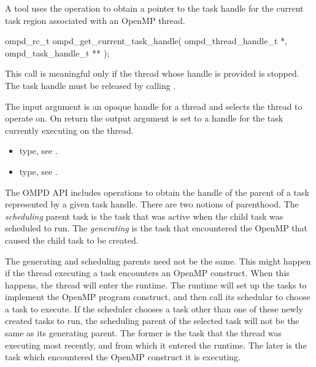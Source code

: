 
\label{ompd:ompd_get_current_task_handle}
\summary
A tool uses the  operation to obtain a pointer to the 
task handle for the current task region associated with an OpenMP thread.

\format

\cspecificstart
\begin{ompSyntax}
ompd_rc_t ompd_get_current_task_handle(
  ompd_thread_handle_t *,
  ompd_task_handle_t **
);
\end{ompSyntax}
\cspecificend


\descr
This call is meaningful only if the thread whose handle is provided is stopped.
The task handle must be released by calling .

\argdesc
The input argument  is an opaque handle for a thread and selects the thread to operate on.
On return the output argument  is set to a handle for the task
currently executing on the thread.

\crossreferences
\begin{itemize}
	\item {} type, see .
	\item {} type, see .
\end{itemize}

The OMPD API includes operations to obtain the handle of the parent of a task represented by a 
given task handle. There are two notions of parenthood. The \emph{scheduling} parent task is the 
task that was active when the child task was scheduled to run. The \emph{generating} is the task 
that encountered the OpenMP that caused the child task to be created.

The generating and scheduling parents need not be the same. This might happen if the thread 
executing a task encounters an OpenMP construct. When this happens, the thread will enter the 
runtime. The runtime will set up the tasks to implement the OpenMP program construct, and then 
call its schedular to choose a task to execute. If the scheduler chooses a task other than one of 
these newly created tasks to run, the scheduling parent of the selected task will not be the same 
as its generating parent. The former is the task that the thread was executing most recently,
and from which it entered the runtime. The later is the task which encountered the OpenMP 
construct it is executing.

